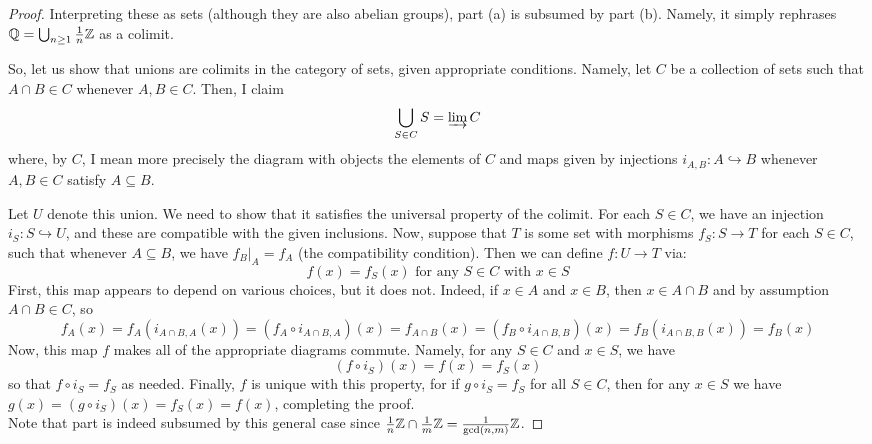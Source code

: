 \documentclass[12pt]{exam}
\begin{document}
\begin{proof}
	Interpreting these as sets (although they are also abelian groups), part (a) is subsumed by part (b). Namely, it simply rephrases $\mathbb{Q} = \bigcup_{n \geq 1} \frac1n\mathbb{Z}$ as a colimit.
	
	So, let us show that unions are colimits in the category of sets, given appropriate conditions. Namely, let $C$ be a collection of sets such that $A \cap B \in C$ whenever $A,B \in C$. Then, I claim
	\[ \bigcup_{S \in C} S = \varinjlim C \]
	where, by $C$, I mean more precisely the diagram with objects the elements of $C$ and maps given by injections $i_{A,B} : A \hookrightarrow B$ whenever $A,B \in C$ satisfy $A \subseteq B$.
	
	Let $U$ denote this union. We need to show that it satisfies the universal property of the colimit. For each $S \in C$, we have an injection $i_S : S \hookrightarrow U$, and these are compatible with the given inclusions. Now, suppose that $T$ is some set with morphisms $f_S : S \to T$ for each $S \in C$, such that whenever $A \subseteq B$, we have $f_B|_A = f_A$ (the compatibility condition). Then we can define $f : U \to T$ via:
	\[ f(x) = f_S(x) \text{ for any }S \in C \text{ with }x \in S \]
	First, this map appears to depend on various choices, but it does not. Indeed, if $x \in A$ and $x \in B$, then $x \in A \cap B$ and by assumption $A \cap B \in C$, so
	\[ f_A(x) = f_A(i_{A \cap B,A}(x)) = (f_A \circ i_{A \cap B,A})(x) = f_{A \cap B}(x) = (f_B \circ i_{A \cap B,B})(x) = f_B(i_{A \cap B,B}(x)) = f_B(x) \]
	Now, this map $f$ makes all of the appropriate diagrams commute. Namely, for any $S \in C$ and $x \in S$, we have
	\[ (f \circ i_S)(x) = f(x) = f_S(x) \]
	so that $f \circ i_S = f_S$ as needed. Finally, $f$ is unique with this property, for if $g \circ i_S = f_S$ for all $S \in C$, then for any $x \in S$ we have $g(x) = (g \circ i_S)(x) = f_S(x) = f(x)$, completing the proof. \\
	
	Note that part is indeed subsumed by this general case since $\frac1n\mathbb{Z} \cap \frac1m\mathbb{Z} = \frac1{\gcd(n,m)}\mathbb{Z}$.
\end{proof}
\end{document}
